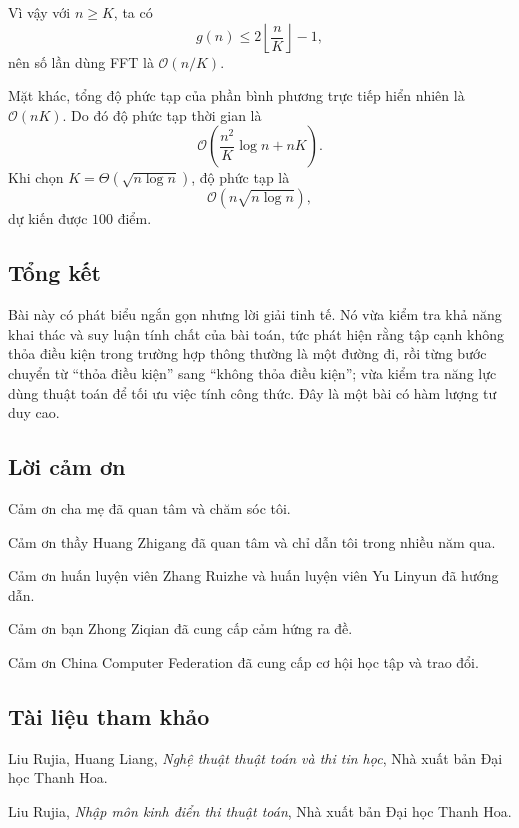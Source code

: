 \documentclass[11pt]{article}
\newcommand{\Oh}{\mathcal{O}}
\begin{document}
Vì vậy với \(n\ge K\), ta có
\[
  g(n)\le 2\left\lfloor\frac{n}{K}\right\rfloor-1,
\]
nên số lần dùng FFT là \(\Oh(n/K)\).

Mặt khác, tổng độ phức tạp của phần bình phương trực tiếp hiển nhiên là
\(\Oh(nK)\). Do đó độ phức tạp thời gian là
\[
  \Oh\left(\frac{n^2}{K}\log n+nK\right).
\]
Khi chọn \(K=\Theta(\sqrt{n\log n})\), độ phức tạp là
\[
  \Oh\left(n\sqrt{n\log n}\right),
\]
dự kiến được \(100\) điểm.

\subsection{Tổng kết}

Bài này có phát biểu ngắn gọn nhưng lời giải tinh tế. Nó vừa kiểm tra khả năng
khai thác và suy luận tính chất của bài toán, tức phát hiện rằng tập cạnh không
thỏa điều kiện trong trường hợp thông thường là một đường đi, rồi từng bước
chuyển từ ``thỏa điều kiện'' sang ``không thỏa điều kiện''; vừa kiểm tra năng
lực dùng thuật toán để tối ưu việc tính công thức. Đây là một bài có hàm lượng
tư duy cao.

\subsection{Lời cảm ơn}

Cảm ơn cha mẹ đã quan tâm và chăm sóc tôi.

Cảm ơn thầy Huang Zhigang đã quan tâm và chỉ dẫn tôi trong nhiều năm qua.

Cảm ơn huấn luyện viên Zhang Ruizhe và huấn luyện viên Yu Linyun đã hướng dẫn.

Cảm ơn bạn Zhong Ziqian đã cung cấp cảm hứng ra đề.

Cảm ơn China Computer Federation đã cung cấp cơ hội học tập và trao đổi.

\subsection*{Tài liệu tham khảo}

\begin{enumerate}[label={[\arabic*]}]
  \item Liu Rujia, Huang Liang, \emph{Nghệ thuật thuật toán và thi tin học},
  Nhà xuất bản Đại học Thanh Hoa.

  \item Liu Rujia, \emph{Nhập môn kinh điển thi thuật toán}, Nhà xuất bản Đại
  học Thanh Hoa.
\end{enumerate}
\end{document}

